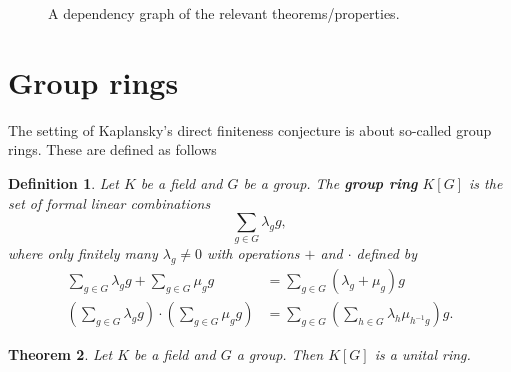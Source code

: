 \documentclass[titlepage, a4paper]{article}
\newcommand{\F}{\mathbb{F}}
\newtheorem{theorem}{Theorem}[section]
\newtheorem{definition}[theorem]{Definition}
\theoremstyle{remark}
\begin{document}
\begin{figure}[h]
	\centering
{}
\caption{A dependency graph of the relevant theorems/properties. }
\end{figure}
\section{Group rings}\label{sec:group_rings}

The setting of Kaplansky's direct finiteness conjecture is about so-called group rings. These are defined as follows


\begin{definition}\label{def:group_ring}
	Let $K$ be a field and $G$ be a group. The \textbf{group ring} $K[G]$ is the set of formal linear combinations
    \[
        \sum_{g \in G} \lambda_g g,
    \]
    where only finitely many $\lambda_g \neq 0$ with operations $+$ and $\cdot$ defined by
    \begin{align*}
        \sum_{g \in G} \lambda_g g + \sum_{g \in G} \mu_g g
        &= \sum_{g \in G} (\lambda_g+\mu_g) g \\
        \left(\sum_{g \in G} \lambda_g g \right) \cdot \left(\sum_{g \in G} \mu_g g \right)
        &= \sum_{g \in G} \left( \sum_{h \in G} \lambda_{h} \mu_{h^{-1}g} \right) g.
    \end{align*}
\end{definition}


\begin{theorem}
    Let $K$ be a field and $G$ a group. Then $K[G]$ is a unital ring.
\end{theorem}
\end{document}
